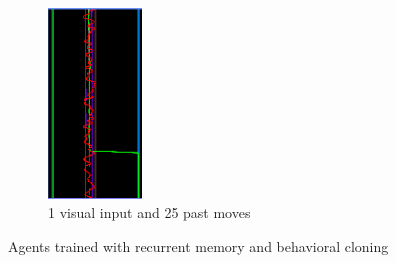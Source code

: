 \begin{figure}[h]
\begin{subfigure}[h]{0.3\textwidth}
        \label{fig:recb}
    \end{subfigure}
    ~ %
    \begin{subfigure}[h]{0.3\textwidth}
        \includegraphics[width=\textwidth]{img/recurrentCaos.png}
        \caption{1 visual input and 25 past moves}
        \label{fig:recc}
    \end{subfigure}
		\caption{Agents trained with recurrent memory and behavioral cloning}
\end{figure}

